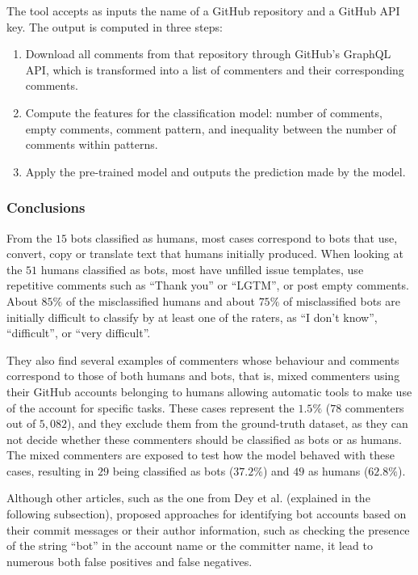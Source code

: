 \documentclass[a4paper, 12pt]{book}
\begin{document}
The tool accepts as inputs the name of a GitHub repository and a GitHub API key. The output is computed in three steps:
\begin{enumerate}
    \item Download all comments from that repository through GitHub's GraphQL API, which is transformed into a list of commenters and their corresponding comments.
    \item Compute the features for the classification model: number of comments, empty comments, comment pattern, and inequality between the number of comments within patterns.
    \item Apply the pre-trained model and outputs the prediction made by the model.
\end{enumerate}

\subsubsection{Conclusions}
\label{sssec:golzadeh-conclusions}

From the $15$ bots classified as humans, most cases correspond to bots that use, convert, copy or translate text that humans initially produced. When looking at the $51$ humans classified as bots, most have unfilled issue templates, use repetitive comments such as ``Thank you'' or ``LGTM'', or post empty comments. About $85\%$ of the misclassified humans and about $75\%$ of misclassified bots are initially difficult to classify by at least one of the raters, as ``I don't know'', ``difficult'', or ``very difficult''.

They also find several examples of commenters whose behaviour and comments correspond to those of both humans and bots, that is, mixed commenters using their GitHub accounts belonging to humans allowing automatic tools to make use of the account for specific tasks. These cases represent the $1.5\%$ ($78$ commenters out of $5,082$), and they exclude them from the ground-truth dataset, as they can not decide whether these commenters should be classified as bots or as humans. The mixed commenters are exposed to test how the model behaved with these cases, resulting in $29$ being classified as bots ($37.2\%$) and $49$ as humans ($62.8\%$). 

Although other articles, such as the one from Dey et al. (explained in the following subsection), proposed approaches for identifying bot accounts based on their commit messages or their author information, such as checking the presence of the string ``bot'' in the account name or the committer name, it lead to numerous both false positives and false negatives.
\end{document}
